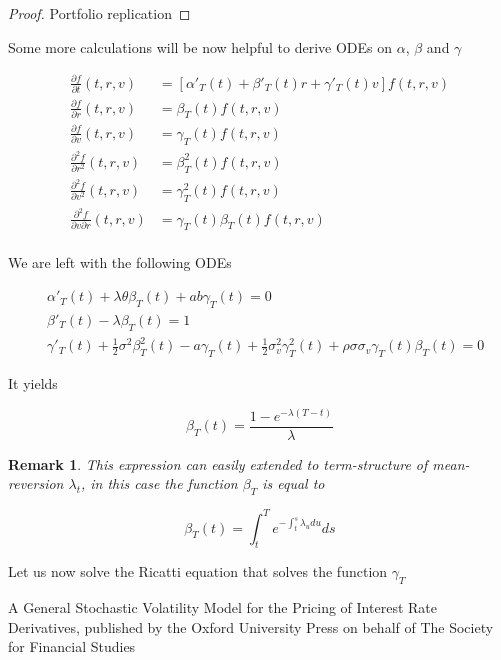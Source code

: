 \documentclass{article}
\newtheorem{remark}{Remark}[section]
\begin{document}
\begin{proof}
	Portfolio replication
\end{proof}

\noindent Some more calculations will be now helpful to derive ODEs on $\alpha$, $\beta$ and $\gamma$

\begin{equation*}
\begin{aligned}
	\frac{\partial f}{\partial t}(t,r,v) &= \left[\alpha'_T(t) + \beta'_T(t) r + \gamma'_T(t) v\right] f(t,r,v)\\
	\frac{\partial f}{\partial r}(t,r,v) &= \beta_T(t) f(t,r,v)\\
	\frac{\partial f}{\partial v}(t,r,v) &= \gamma_T(t) f(t,r,v)\\
	\frac{\partial^2 f}{\partial r^2}(t,r,v) &= \beta^2_T(t) f(t,r,v)\\
	\frac{\partial^2 f}{\partial v^2}(t,r,v) &= \gamma^2_T(t) f(t,r,v)\\
	\frac{\partial^2 f}{\partial v \partial r}(t,r,v) &= \gamma_T(t) \beta_T(t) f(t,r,v)\\
\end{aligned}
\end{equation*}

\noindent We are left with the following ODEs

\begin{equation*}
\begin{aligned}
	&\alpha'_T(t) + \lambda \theta \beta_T(t) + a b \gamma_T(t) = 0\\
	&\beta'_T(t) - \lambda \beta_T(t) = 1\\
	&\gamma'_T(t) + \frac{1}{2} \sigma^2 \beta_T^2(t) - a \gamma_T(t) + \frac{1}{2} \sigma_v^2 \gamma_T^2(t) + \rho \sigma \sigma_v \gamma_T(t) \beta_T(t) = 0
\end{aligned}
\end{equation*}

\noindent It yields

\begin{equation}
	\beta_T(t) = \frac{1 - e^{-\lambda (T-t)}}{\lambda}
\end{equation}

\begin{remark}
 This expression can easily extended to term-structure of mean-reversion $\lambda_t$, in this case the function $\beta_T$ is equal to 

\begin{equation}
	\beta_T(t) = \int_t^T e^{-\int_t^s \lambda_u du} ds
\end{equation}
\end{remark}

Let us now solve the Ricatti equation that solves the function $\gamma_T$

\begin{thebibliography}{9}
	 A General Stochastic Volatility Model for the Pricing of Interest Rate Derivatives, published by the Oxford University Press on behalf of The Society for Financial Studies
\end{thebibliography}
\end{document}
